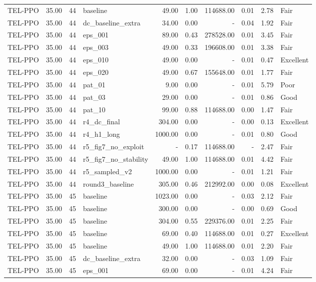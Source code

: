 \begin{table}[htbp]
\begin{tabular}{lrrlrrrrrl}
TEL-PPO & 35.00 & 44 & baseline & 49.00 & 1.00 & 114688.00 & 0.01 & 2.78 & Fair \\
TEL-PPO & 35.00 & 44 & dc_baseline_extra & 34.00 & 0.00 & - & 0.04 & 1.92 & Fair \\
TEL-PPO & 35.00 & 44 & eps_001 & 89.00 & 0.43 & 278528.00 & 0.01 & 3.45 & Fair \\
TEL-PPO & 35.00 & 44 & eps_003 & 49.00 & 0.33 & 196608.00 & 0.01 & 3.38 & Fair \\
TEL-PPO & 35.00 & 44 & eps_010 & 49.00 & 0.00 & - & 0.01 & 0.47 & Excellent \\
TEL-PPO & 35.00 & 44 & eps_020 & 49.00 & 0.67 & 155648.00 & 0.01 & 1.77 & Fair \\
TEL-PPO & 35.00 & 44 & pat_01 & 9.00 & 0.00 & - & 0.01 & 5.79 & Poor \\
TEL-PPO & 35.00 & 44 & pat_03 & 29.00 & 0.00 & - & 0.01 & 0.86 & Good \\
TEL-PPO & 35.00 & 44 & pat_10 & 99.00 & 0.88 & 114688.00 & 0.00 & 1.47 & Fair \\
TEL-PPO & 35.00 & 44 & r4_dc_final & 304.00 & 0.00 & - & 0.00 & 0.13 & Excellent \\
TEL-PPO & 35.00 & 44 & r4_h1_long & 1000.00 & 0.00 & - & 0.01 & 0.80 & Good \\
TEL-PPO & 35.00 & 44 & r5_fig7_no_exploit & - & 0.17 & 114688.00 & - & 2.47 & Fair \\
TEL-PPO & 35.00 & 44 & r5_fig7_no_stability & 49.00 & 1.00 & 114688.00 & 0.01 & 4.42 & Fair \\
TEL-PPO & 35.00 & 44 & r5_sampled_v2 & 1000.00 & 0.00 & - & 0.01 & 1.21 & Fair \\
TEL-PPO & 35.00 & 44 & round3_baseline & 305.00 & 0.46 & 212992.00 & 0.00 & 0.08 & Excellent \\
TEL-PPO & 35.00 & 45 & baseline & 1023.00 & 0.00 & - & 0.03 & 2.12 & Fair \\
TEL-PPO & 35.00 & 45 & baseline & 300.00 & 0.00 & - & 0.00 & 0.69 & Good \\
TEL-PPO & 35.00 & 45 & baseline & 304.00 & 0.55 & 229376.00 & 0.01 & 2.25 & Fair \\
TEL-PPO & 35.00 & 45 & baseline & 69.00 & 0.40 & 114688.00 & 0.01 & 0.27 & Excellent \\
TEL-PPO & 35.00 & 45 & baseline & 49.00 & 1.00 & 114688.00 & 0.01 & 2.20 & Fair \\
TEL-PPO & 35.00 & 45 & dc_baseline_extra & 32.00 & 0.00 & - & 0.03 & 1.09 & Fair \\
TEL-PPO & 35.00 & 45 & eps_001 & 69.00 & 0.00 & - & 0.01 & 4.24 & Fair \\

\end{tabular}
\end{table}
